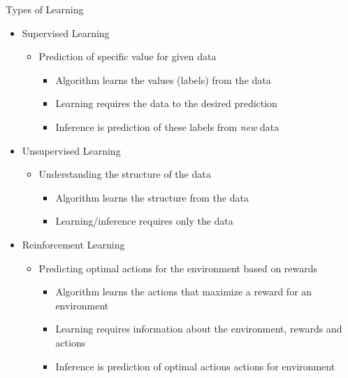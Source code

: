 \documentclass[10pt]{beamer}
\begin{document}
\begin{frame}{Types of Learning}
	\begin{itemize}
		\item Supervised Learning
			\begin{itemize}
				\item Prediction of specific value for given data
				\begin{itemize}
					\item Algorithm learns the values (labels) from the data
					\item Learning requires the data to the desired prediction
					\item Inference is prediction of these labels from \alert{\emph{new}} data
				\end{itemize}
			\end{itemize}
		  \pause
		\item Unsupervised Learning
			\begin{itemize}
				\item Understanding the structure of the data
				\begin{itemize}
					\item Algorithm learns the structure from the data
					\item Learning/inference requires only the data
				\end{itemize}
			\end{itemize}
		  \pause
		\item Reinforcement Learning
			\begin{itemize}
				\item Predicting optimal actions for the environment based on rewards
				\begin{itemize}
					\item Algorithm learns the actions that maximize a reward for an environment 
					\item Learning requires information about the environment, rewards and actions
					\item Inference is prediction of optimal actions actions for environment
				\end{itemize}
			\end{itemize}
	\end{itemize}
\end{frame}
\end{document}
